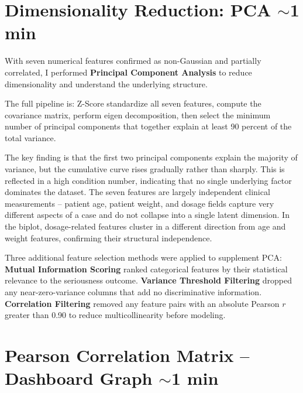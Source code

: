 \documentclass[12pt, letterpaper]{article}
\begin{document}
\section{Dimensionality Reduction: PCA \hfill \textcolor{slidenumber}{\small $\sim$1 min}}

With seven numerical features confirmed as non-Gaussian and partially
correlated, I performed \textbf{Principal Component Analysis} to reduce
dimensionality and understand the underlying structure.

The full pipeline is: Z-Score standardize all seven features, compute the
covariance matrix, perform eigen decomposition, then select the minimum number
of principal components that together explain at least 90 percent of the total
variance.

The key finding is that the first two principal components explain the majority
of variance, but the cumulative curve rises gradually rather than sharply. This
is reflected in a high condition number, indicating that no single underlying
factor dominates the dataset. The seven features are largely independent
clinical measurements -- patient age, patient weight, and dosage fields capture
very different aspects of a case and do not collapse into a single latent
dimension. In the biplot, dosage-related features cluster in a different
direction from age and weight features, confirming their structural independence.

Three additional feature selection methods were applied to supplement PCA:
\textbf{Mutual Information Scoring} ranked categorical features by their
statistical relevance to the seriousness outcome.
\textbf{Variance Threshold Filtering} dropped any near-zero-variance columns
that add no discriminative information.
\textbf{Correlation Filtering} removed any feature pairs with an absolute
Pearson $r$ greater than 0.90 to reduce multicollinearity before modeling.

\section{Pearson Correlation Matrix -- Dashboard Graph \hfill \textcolor{slidenumber}{\small $\sim$1 min}}
\end{document}
